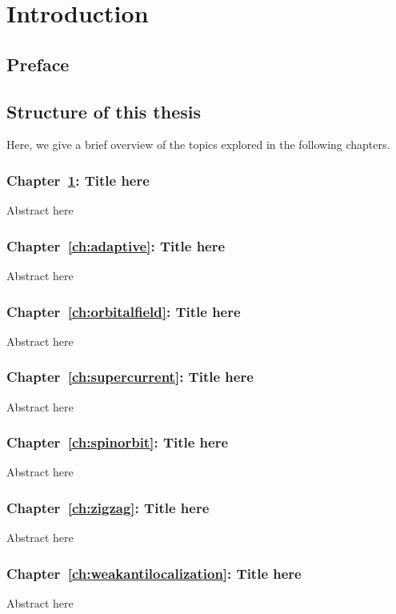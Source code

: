 \chapter{Introduction}
\label{ch:introduction}

\section{Preface}


\section{Structure of this thesis}

Here, we give a brief overview of the topics explored in the following chapters.
\vspace{1mm}

\subsection{Chapter~\ref{ch:introduction}: Title here}
Abstract here
\vspace{1mm}
\subsection{Chapter~\ref{ch:adaptive}: Title here}
Abstract here
\vspace{1mm}
\subsection{Chapter~\ref{ch:orbitalfield}: Title here}
Abstract here
\vspace{1mm}
\subsection{Chapter~\ref{ch:supercurrent}: Title here}
Abstract here
\vspace{1mm}
\subsection{Chapter~\ref{ch:spinorbit}: Title here}
Abstract here
\vspace{1mm}
\subsection{Chapter~\ref{ch:zigzag}: Title here}
Abstract here
\vspace{1mm}
\subsection{Chapter~\ref{ch:weakantilocalization}: Title here}
Abstract here
\vspace{1mm}

